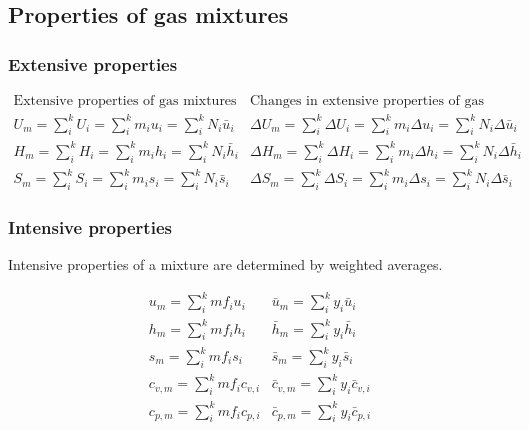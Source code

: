 \documentclass[11pt]{article}
\begin{document}
\subsection{Properties of gas mixtures}
\label{sec:org0721cd0}

\subsubsection{Extensive properties}
\label{sec:org340a55d}
\begin{displaymath}
\begin{array}{c|c}
\text{Extensive properties of gas mixtures} & \text{Changes in extensive properties of gas mixtures} \\
\hline
U_m = \sum_i^k U_i = \sum_i^k m_i u_i = \sum_i^k N_i \bar{u}_i &
\Delta U_m = \sum_i^k \Delta U_i = \sum_i^k m_i \Delta u_i = \sum_i^k N_i \Delta \bar{u}_i \\
H_m = \sum_i^k H_i = \sum_i^k m_i h_i = \sum_i^k N_i \bar{h}_i &
\Delta H_m = \sum_i^k \Delta H_i = \sum_i^k m_i \Delta h_i = \sum_i^k N_i \Delta \bar{h}_i \\
S_m = \sum_i^k S_i = \sum_i^k m_i s_i = \sum_i^k N_i \bar{s}_i &
\Delta S_m = \sum_i^k \Delta S_i = \sum_i^k m_i \Delta s_i = \sum_i^k N_i \Delta \bar{s}_i
\end{array}
\end{displaymath}

\subsubsection{Intensive properties}
\label{sec:org99e38fd}
Intensive properties of a mixture are determined by weighted averages.

\begin{displaymath}
\begin{array}{c|c}
u_m = \sum_i^k mf_i u_i & \bar{u}_m = \sum_i^k y_i \bar{u}_i \\
h_m = \sum_i^k mf_i h_i & \bar{h}_m = \sum_i^k y_i \bar{h}_i \\
s_m = \sum_i^k mf_i s_i & \bar{s}_m = \sum_i^k y_i \bar{s}_i \\
c_{v,m} = \sum_i^k mf_i c_{v,i} & \bar{c}_{v,m} = \sum_i^k y_i \bar{c}_{v,i} \\
c_{p,m} = \sum_i^k mf_i c_{p,i} & \bar{c}_{p,m} = \sum_i^k y_i \bar{c}_{p,i} \\
\end{array}
\end{displaymath}
\end{document}
